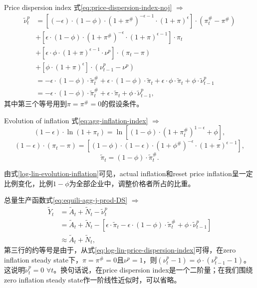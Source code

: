 Price dispersion index 式\eqref{eq:price-dispersion-index-noj} $\Rightarrow$
\begin{align}
\label{eq:log-lin-price-dispersion-index}
  \tilde{\nu}^p_t &= \left[(-\epsilon) \cdot (1-\phi) \cdot (1+\pi^{\#})^{-\epsilon -1} \cdot (1+\pi)^{\epsilon}\right] \cdot (\pi^{\#}_t - \pi^{\#}) \nonumber\\
                    &+ \left[ \epsilon \cdot (1-\phi) \cdot (1+\pi^{\#})^{-\epsilon} \cdot (1+\pi)^{\epsilon -1} \right] \cdot \pi_t \nonumber\\
                    &+\left[ \epsilon \cdot \phi \cdot (1+\pi)^{\epsilon -1} \cdot \nu^p \right] \cdot (\pi_t - \pi) \nonumber\\
                    &+\left[ \phi \cdot (1+\pi)^{\epsilon} \right] \cdot \left(\nu^p_{t-1} - \nu^p \right) \nonumber\\
                  &=-\epsilon \cdot (1-\phi) \cdot \tilde{\pi}^{\#}_t + \epsilon \cdot (1-\phi) \cdot \tilde{\pi}_t + \epsilon \cdot \phi \cdot \tilde{\pi}_t + \phi \cdot \tilde{\nu}^p_{t-1} \nonumber\\
                    &=-\epsilon \cdot (1-\phi) \cdot \tilde{\pi}^{\#}_t + \epsilon \cdot \tilde{\pi}_t + \phi \cdot \tilde{\nu}^p_{t-1},
\end{align}
其中第三个等号用到$\pi = \pi^{\#} = 0$的假设条件。


Evolution of inflation 式\eqref{eq:agg-inflation-index} $\Rightarrow$
\begin{equation*}
  (1-\epsilon) \cdot \ln (1+\pi_t) = \ln \left[ (1-\phi) \cdot \left(1+\pi^{\#}_t\right)^{1-\epsilon} + \phi \right],
\end{equation*}
\begin{equation*}
  (1-\epsilon) \cdot (\pi_t - \pi) =
  \left[
    (1-\phi) \cdot (1-\epsilon) \cdot \left( 1+\phi^{\#} \right)^{-\epsilon} \cdot (1+\pi)^{\epsilon -1}
  \right],
\end{equation*}
\begin{equation}
  \label{log-lin-evolution-inflation}
  \tilde{\pi}_t = (1-\phi) \cdot \tilde{\pi}^{\#}_t.
\end{equation}

由式\eqref{log-lin-evolution-inflation}可见，actual inflation和reset price inflation呈一定比例变化，比例$1-\phi$为全部企业中，调整价格者所占的比重。

总量生产函数式\eqref{eq:equili-agg-j-prod-DS} $\Rightarrow$
\begin{align}
  \label{eq:log-lin-agg-prod-func}
  \tilde{Y}_t &= \tilde{A}_t + \tilde{N}_t - \tilde{\nu}^p_t \nonumber \\
              &=\tilde{A}_t + \tilde{N}_t - \left[\epsilon \cdot \tilde{\pi}_t -\epsilon \cdot (1-\phi) \cdot \tilde{\pi}^{\#}_t + \phi \cdot \tilde{\nu}^p_{t-1}\right]\nonumber \\
              &\approx \tilde{A}_t + \tilde{N}_t,
\end{align}
第三行的约等号是由于，从式\eqref{eq:log-lin-price-dispersion-index}可得，在zero inflation steady state下，$\pi=\pi^{\#}=0$且$\nu^p=1$，则$(\nu^p_t-1) = \phi \cdot (\nu^p_{t-1}-1)$。这说明$\tilde{\nu}^p_t=0$ $\forall t$。换句话说，在price dispersion index是一个二阶量；在我们围绕zero inflation steady state作一阶线性近似时，可以省略。

